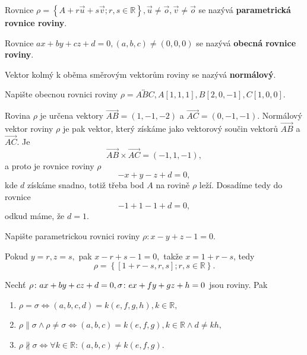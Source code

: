 \begin{definition}
    Rovnice $\rho =\left\{ A+r\vec u+s\vec v; r, s \in \mathbb R\right\}, \vec u \neq \vec o, \vec v \neq \vec o$ se nazývá \textbf{parametrická rovnice roviny}.
\end{definition}

\begin{definition}
    Rovnice $ax+by+cz+d=0, (a,b,c)\ne(0,0,0)$ se nazývá \textbf{obecná rovnice roviny}.
\end{definition}

\begin{definition}
    Vektor kolmý k oběma směrovým vektorům roviny se nazývá \textbf{normálový}.
\end{definition}

\begin{priklad}
Napište obecnou rovnici roviny $\rho = \overleftrightarrow{ABC}, A[1,1,1], B[2,0,-1], C[1,0,0].$
\end{priklad}

\begin{reseni}
Rovina $\rho$ je určena vektory $\overrightarrow{AB}=(1,-1,-2)$ a $\overrightarrow{AC}=(0,-1,-1)$.
Normálový vektor roviny $\rho$ je pak vektor, který získáme jako vektorový součin vektorů
$\overrightarrow{AB}$ a $\overrightarrow{AC}$. Je
$$
  \overrightarrow{AB}\times \overrightarrow{AC} = (-1,1,-1),
$$
a proto je rovnice roviny $\rho$
$$
    -x+y-z + d =0,
$$
kde $d$ získáme snadno, totiž třeba bod $A$ na rovině $\rho$ leží. Dosadíme tedy do rovnice
$$
    -1+1-1 + d = 0,
$$
odkud máme, že $d=1$.
\end{reseni}

\begin{priklad}
Napište parametrickou rovnici roviny $\rho\colon x-y+z-1=0.$
\end{priklad}

\begin{reseni}
Pokud $y=r, z=s,$ pak $x-r+s-1=0,$ takže $x=1+r-s$, tedy
$$\rho = \left \{ [1+r-s,r,s]; r,s\in \mathbb R \right \}. $$
\end{reseni}

\begin{veta}
    Nechť $\rho\colon ax+by+cz\linebreak+ d=0, \sigma\colon ex+fy+gz+h=0$ jsou roviny. Pak
    \begin{enumerate}[$i.$]
    \item $\rho = \sigma \iff (a,b,c,d) = k(e,f,g,h), k\in \mathbb R,$
   	\item $\rho \parallel \sigma \land \rho \ne \sigma \iff (a,b,c) = k(e,f,g), k\in \mathbb R
    \land d\ne kh,$
   	\item $\rho \nparallel \sigma \iff \forall k \in \mathbb R\colon (a,b,c) \ne k(e,f,g)$.
    \end{enumerate}
\end{veta}

